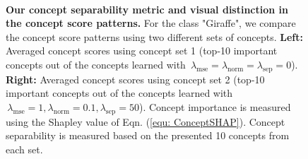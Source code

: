\begin{figure}[bt]
\centering
{}
\hfill \hspace{-2mm}
\hfill\\
\hfill
{}
\caption{
\small \textbf{Our concept separability metric and visual distinction in the concept score patterns.} For the class "Giraffe", we compare the concept score patterns using two different sets of concepts. \textbf{Left:} Averaged concept scores using concept set 1 (top-10 important concepts out of the concepts learned with $\,\lambda_\textrm{mse} = \lambda_\textrm{norm} = \lambda_\textrm{sep} = 0$). 
\textbf{Right:} Averaged concept scores using concept set 2 (top-10 important concepts out of the concepts learned with $\,\lambda_\textrm{mse} = 1, \lambda_\textrm{norm} = 0.1, \lambda_\textrm{sep} = 50$).
Concept importance is measured using the Shapley value of Eqn. (\ref{equ: ConceptSHAP}).
Concept separability is measured based on the presented 10 concepts from each set.
}
\label{fig:high_separa_interpretatbility}
\vspace{-0.10in}
\end{figure}

